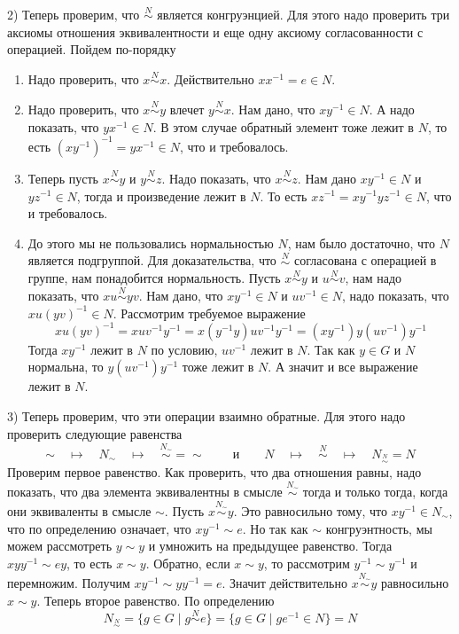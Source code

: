 2) Теперь проверим, что $\stackrel{N}{\sim}$ является конгруэнцией.
Для этого надо проверить три аксиомы отношения эквивалентности и еще одну аксиому согласованности с операцией.
Пойдем по-порядку
\begin{enumerate}
\item Надо проверить, что $x \stackrel{N}{\sim}x$.
Действительно $xx^{-1} = e \in N$.

\item Надо проверить, что $x\stackrel{N}{\sim}y$ влечет $y \stackrel{N}{\sim}x$.
Нам дано, что $xy^{-1}\in N$.
А надо показать, что $yx^{-1}\in N$.
В этом случае обратный элемент тоже лежит в $N$, то есть
$(xy^{-1})^{-1} = yx^{-1}\in N$, что и требовалось.

\item Теперь пусть $x\stackrel{N}{\sim}y$ и $y\stackrel{N}{\sim}z$.
Надо показать, что $x\stackrel{N}{\sim}z$.
Нам дано $xy^{-1}\in N$ и $yz^{-1}\in N$, тогда и произведение лежит в $N$.
То есть $xz^{-1} =  xy^{-1} yz^{-1}\in N$, что и требовалось.

\item До этого мы не пользовались нормальностью $N$, нам было достаточно, что $N$ является подгруппой.
Для доказательства, что $\stackrel{N}{\sim}$ согласована с операцией в группе, нам понадобится нормальность.
Пусть $x\stackrel{N}{\sim}y$ и $u\stackrel{N}{\sim}v$, нам надо показать, что $x u \stackrel{N}{\sim} y v$.
Нам дано, что $xy^{-1}\in N$ и $uv^{-1}\in N$, надо показать, что $xu(yv)^{-1}\in N$.
Рассмотрим требуемое выражение
\[
xu(yv)^{-1} = xu v^{-1} y^{-1} = x(y^{-1}y)u v^{-1} y^{-1} = (xy^{-1})y(u v^{-1}) y^{-1}
\]
Тогда $xy^{-1}$ лежит в $N$ по условию, $uv^{-1}$ лежит в $N$.
Так как $y\in G$ и $N$ нормальна, то $y(uv^{-1})y^{-1}$ тоже лежит в $N$.
А значит и все выражение лежит в $N$.
\end{enumerate}

3) Теперь проверим, что эти операции взаимно обратные.
Для этого надо проверить следующие равенства
\[
\sim \quad\mapsto\quad N_\sim\quad \mapsto\quad \stackrel{N_\sim}{\sim} = \sim\
\quad\quad
\text{и}
\quad\quad
N \quad\mapsto \quad\stackrel{N}{\sim} \quad\mapsto\quad N_{\stackrel{N}{\sim}} = N
\]
Проверим первое равенство.
Как проверить, что два отношения равны, надо показать, что два элемента эквивалентны в смысле $\stackrel{N_\sim}{\sim}$ тогда и только тогда, когда они эквиваленты в смысле $\sim$.
Пусть $x\stackrel{N_\sim}{\sim} y$.
Это равносильно тому, что $xy^{-1}\in  N_\sim$, что по определению означает, что $xy^{-1}\sim e$.
Но так как $\sim$ конгруэнтность, мы можем рассмотреть $y\sim y$ и умножить на предыдущее равенство.
Тогда $xyy^{-1}\sim e y$, то есть $x\sim y$.
Обратно, если $x\sim y$, то рассмотрим $y^{-1}\sim y^{-1}$ и перемножим.
Получим $xy^{-1}\sim y y^{-1} = e$.
Значит действительно $x\stackrel{N_\sim}{\sim} y$ равносильно $x\sim y$.
Теперь второе равенство.
По определению
\[
N_{\stackrel{N}{\sim}} = \{g\in G \mid g \stackrel{N}{\sim} e\} = \{g\in G \mid g e^{-1}\in N\} = N
\]

